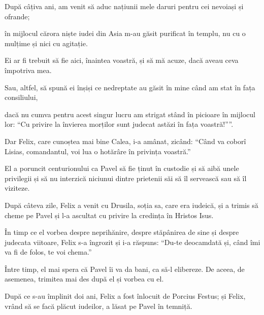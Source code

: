 {După câțiva ani, am venit să aduc națiunii mele daruri pentru cei nevoiași și ofrande;

în mijlocul cărora niște iudei din Asia m-au găsit purificat în templu, nu cu o mulțime și nici cu agitație.

Ei ar fi trebuit să fie aici, înaintea voastră, și să mă acuze, dacă aveau ceva împotriva mea.

Sau, altfel, să spună ei înșiși ce nedreptate au găsit în mine când am stat în fața consiliului,

dacă nu cumva pentru acest singur lucru am strigat stând în picioare în mijlocul lor: “Cu privire la învierea morților sunt judecat astăzi în fața voastră!””.


\par }{\PP {}Dar Felix, care cunoștea mai bine Calea, i-a amânat, zicând: “Când va coborî Lisias, comandantul, voi lua o hotărâre în privința voastră.”

El a poruncit centurionului ca Pavel să fie ținut în custodie și să aibă unele privilegii și să nu interzică niciunui dintre prietenii săi să îl servească sau să îl viziteze.


\par }{\PP {}După câteva zile, Felix a venit cu Drusila, soția sa, care era iudeică, și a trimis să cheme pe Pavel și l-a ascultat cu privire la credința în Hristos Isus.

În timp ce el vorbea despre neprihănire, despre stăpânirea de sine și despre judecata viitoare, Felix s-a îngrozit și i-a răspuns: “Du-te deocamdată și, când îmi va fi de folos, te voi chema.”

Între timp, el mai spera că Pavel îi va da bani, ca să-l elibereze. De aceea, de asemenea, trimitea mai des după el și vorbea cu el.


\par }{\PP {}După ce s-au împlinit doi ani, Felix a fost înlocuit de Porcius Festus; și Felix, vrând să se facă plăcut iudeilor, a lăsat pe Pavel în temniță.



\par }
